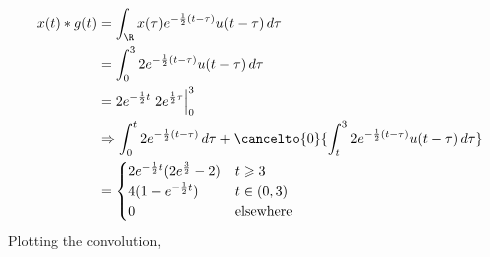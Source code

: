 \documentclass{article}
\begin{document}
\begin{align}
    x(t) \ast g(t) &= \int_{\R} x(\tau) e^{-\frac{1}{2} (t - \tau)} u(t - \tau) \, d\tau \\
    &= \int_0^3 2e^{-\frac{1}{2} (t - \tau)} u(t - \tau) \, d\tau \\
    &= 2e^{-\frac{1}{2} t} \left.2e^{\frac{1}{2} \tau}\right|_0^3 \\
    &\Rightarrow \int_0^t 2e^{-\frac{1}{2} (t - \tau)} \, d\tau + \cancelto{0}{\int_t^3 2e^{-\frac{1}{2} (t - \tau)} u(t - \tau) \, d\tau} \\
    &=
    \begin{cases}
        2e^{-\frac{1}{2} t} (2e^{\frac{3}{2}} - 2) & t \geqslant 3 \\
        4(1 - e^{-\frac{1}{2} t}) & t \in (0, 3) \\
        0 & \text{elsewhere}
    \end{cases}
\end{align}
Plotting the convolution,
\begin{center}
\end{center}

\subsection{}
\end{document}
